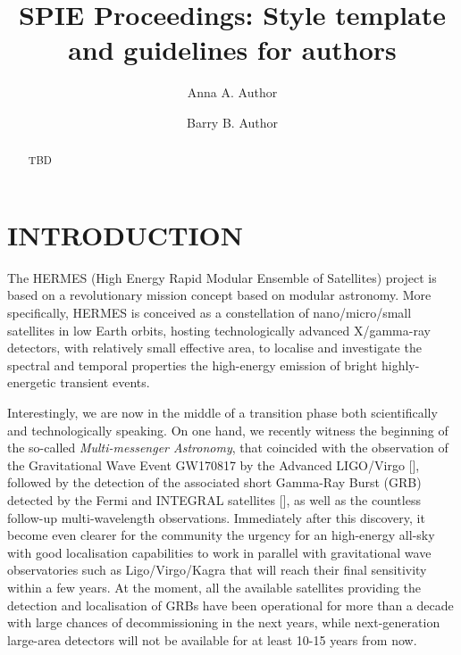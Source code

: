 \documentclass[]{spie}  %
\title{SPIE Proceedings: Style template and guidelines for authors}
\author[a]{Anna A. Author}
\author[b]{Barry B. Author}
\affil[a]{Affiliation1, Address, City, Country}
\affil[b]{Affiliation2, Address, City, Country}
\begin{document}
 
\maketitle

\begin{abstract}
TBD  
\end{abstract}


\section{INTRODUCTION}


The HERMES (High Energy Rapid Modular Ensemble of Satellites) project is based on a revolutionary mission concept based on modular astronomy. More specifically, HERMES is conceived as a constellation of nano/micro/small satellites in low Earth orbits, hosting technologically advanced X/gamma-ray detectors, with relatively small effective area, to localise and investigate the spectral and temporal properties the high-energy emission of bright highly-energetic transient events.

Interestingly, we are now in the middle of a transition phase both scientifically and technologically speaking. On one hand, we recently witness the beginning of the so-called \emph{Multi-messenger Astronomy}, that coincided with the observation of the Gravitational Wave Event GW170817 by the Advanced LIGO/Virgo [], followed by the detection of the associated short Gamma-Ray Burst (GRB) detected by the Fermi and INTEGRAL satellites [], as well as the countless follow-up multi-wavelength observations. Immediately after this discovery, it become even clearer for the community the urgency for an high-energy all-sky with good localisation capabilities to work in parallel with gravitational wave observatories such as Ligo/Virgo/Kagra that will reach their final sensitivity within a few years. At the moment, all the available satellites providing the detection and localisation of GRBs have been operational for more than a decade with large chances of decommissioning in the next years, while next-generation large-area detectors will not be available for at least 10-15 years from now. 
\end{document}
